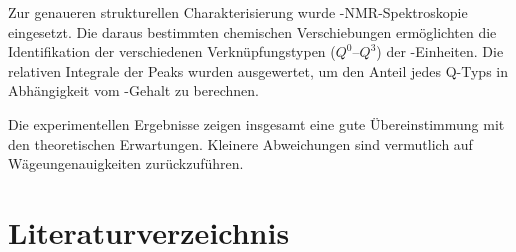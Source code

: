 \documentclass[12pt, a4paper]{article}
\begin{document}
\noindent
Zur genaueren strukturellen Charakterisierung wurde -NMR-Spektroskopie eingesetzt. Die daraus bestimmten chemischen Verschiebungen ermöglichten die Identifikation der verschiedenen Verknüpfungstypen ($Q^0$–$Q^3$) der -Einheiten. Die relativen Integrale der Peaks wurden ausgewertet, um den Anteil jedes Q-Typs in Abhängigkeit vom -Gehalt zu berechnen.

\noindent
Die experimentellen Ergebnisse zeigen insgesamt eine gute Übereinstimmung mit den theoretischen Erwartungen.\cite{Kirkpatrick.1995} Kleinere Abweichungen sind vermutlich auf Wägeungenauigkeiten zurückzuführen.



\newpage
\section{Literaturverzeichnis}
\printbibliography
\end{document}
